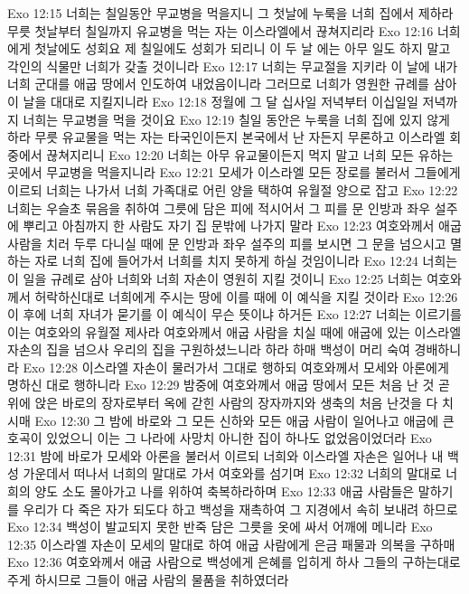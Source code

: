 Exo 12:15  너희는 칠일동안 무교병을 먹을지니 그 첫날에 누룩을 너희 집에서 제하라 무릇 첫날부터 칠일까지 유교병을 먹는 자는 이스라엘에서 끊쳐지리라
Exo 12:16  너희에게 첫날에도 성회요 제 칠일에도 성회가 되리니 이 두 날 에는 아무 일도 하지 말고 각인의 식물만 너희가 갖출 것이니라
Exo 12:17  너희는 무교절을 지키라 이 날에 내가 너희 군대를 애굽 땅에서 인도하여 내었음이니라 그러므로 너희가 영원한 규례를 삼아 이 날을 대대로 지킬지니라
Exo 12:18  정월에 그 달 십사일 저녁부터 이십일일 저녁까지 너희는 무교병을 먹을 것이요
Exo 12:19  칠일 동안은 누룩을 너희 집에 있지 않게 하라 무릇 유교물을 먹는 자는 타국인이든지 본국에서 난 자든지 무론하고 이스라엘 회중에서 끊쳐지리니
Exo 12:20  너희는 아무 유교물이든지 먹지 말고 너희 모든 유하는 곳에서 무교병을 먹을지니라
Exo 12:21  모세가 이스라엘 모든 장로를 불러서 그들에게 이르되 너희는 나가서 너희 가족대로 어린 양을 택하여 유월절 양으로 잡고
Exo 12:22  너희는 우슬초 묶음을 취하여 그릇에 담은 피에 적시어서 그 피를 문 인방과 좌우 설주에 뿌리고 아침까지 한 사람도 자기 집 문밖에 나가지 말라
Exo 12:23  여호와께서 애굽 사람을 치러 두루 다니실 때에 문 인방과 좌우 설주의 피를 보시면 그 문을 넘으시고 멸하는 자로 너희 집에 들어가서 너희를 치지 못하게 하실 것임이니라
Exo 12:24  너희는 이 일을 규례로 삼아 너희와 너희 자손이 영원히 지킬 것이니
Exo 12:25  너희는 여호와께서 허락하신대로 너희에게 주시는 땅에 이를 때에 이 예식을 지킬 것이라
Exo 12:26  이 후에 너희 자녀가 묻기를 이 예식이 무슨 뜻이냐 하거든
Exo 12:27  너희는 이르기를 이는 여호와의 유월절 제사라 여호와께서 애굽 사람을 치실 때에 애굽에 있는 이스라엘 자손의 집을 넘으사 우리의 집을 구원하셨느니라 하라 하매 백성이 머리 숙여 경배하니라
Exo 12:28  이스라엘 자손이 물러가서 그대로 행하되 여호와께서 모세와 아론에게 명하신 대로 행하니라
Exo 12:29  밤중에 여호와께서 애굽 땅에서 모든 처음 난 것 곧 위에 앉은 바로의 장자로부터 옥에 갇힌 사람의 장자까지와 생축의 처음 난것을 다 치시매
Exo 12:30  그 밤에 바로와 그 모든 신하와 모든 애굽 사람이 일어나고 애굽에 큰 호곡이 있었으니 이는 그 나라에 사망치 아니한 집이 하나도 없었음이었더라
Exo 12:31  밤에 바로가 모세와 아론을 불러서 이르되 너희와 이스라엘 자손은 일어나 내 백성 가운데서 떠나서 너희의 말대로 가서 여호와를 섬기며
Exo 12:32  너희의 말대로 너희의 양도 소도 몰아가고 나를 위하여 축복하라하며
Exo 12:33  애굽 사람들은 말하기를 우리가 다 죽은 자가 되도다 하고 백성을 재촉하여 그 지경에서 속히 보내려 하므로
Exo 12:34  백성이 발교되지 못한 반죽 담은 그릇을 옷에 싸서 어깨에 메니라
Exo 12:35  이스라엘 자손이 모세의 말대로 하여 애굽 사람에게 은금 패물과 의복을 구하매
Exo 12:36  여호와께서 애굽 사람으로 백성에게 은혜를 입히게 하사 그들의 구하는대로 주게 하시므로 그들이 애굽 사람의 물품을 취하였더라

